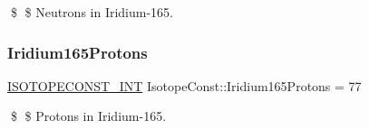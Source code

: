 \$ \$ Neutrons in Iridium-\/165. \mbox{\label{group___isotope_const-_iridium-_ir165_ga94d63f1c8b68cb888809b7d00ce1d406}} 
\subsubsection{\texorpdfstring{Iridium165\+Protons}{Iridium165Protons}}
{\footnotesize\ttfamily \mbox{\hyperlink{group___isotope_const-_macros_ga5f18360b3e99483a35c32d789e62621c}{I\+S\+O\+T\+O\+P\+E\+C\+O\+N\+S\+T\+\_\+\+I\+NT}} Isotope\+Const\+::\+Iridium165\+Protons = 77}

\$ \$ Protons in Iridium-\/165. 